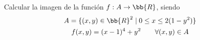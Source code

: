 \begin{ejercicio}
   Calcular la imagen de la función $f:A\to \bb{R}$, siendo
   \begin{gather*}
       A = \{(x,y)\in \bb{R}^2\mid 0\leq x \leq 2(1-y^2)\} \\
       f(x,y)=(x-1)^4 + y^2 \qquad \forall (x,y)\in A
   \end{gather*}
\end{ejercicio}